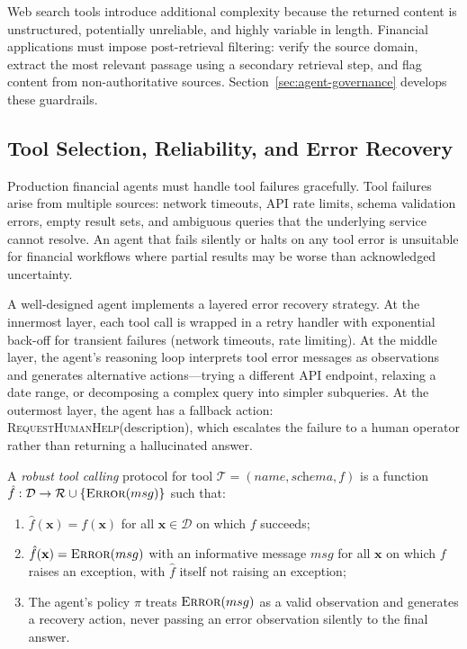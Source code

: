 \begin{deepdive}
Web search tools introduce additional complexity because the returned content is
unstructured, potentially unreliable, and highly variable in length. Financial
applications must impose post-retrieval filtering: verify the source domain, extract
the most relevant passage using a secondary retrieval step, and flag content from
non-authoritative sources. Section~\ref{sec:agent-governance} develops these guardrails.


\subsection{Tool Selection, Reliability, and Error Recovery}
\label{subsec:tool-reliability}

Production financial agents must handle tool failures gracefully. Tool failures arise
from multiple sources: network timeouts, API rate limits, schema validation errors,
empty result sets, and ambiguous queries that the underlying service cannot resolve.
An agent that fails silently or halts on any tool error is unsuitable for financial
workflows where partial results may be worse than acknowledged uncertainty.

A well-designed agent implements a layered error recovery strategy. At the innermost
layer, each tool call is wrapped in a retry handler with exponential back-off for
transient failures (network timeouts, rate limiting). At the middle layer, the agent's
reasoning loop interprets tool error messages as observations and generates alternative
actions---trying a different API endpoint, relaxing a date range, or decomposing a
complex query into simpler subqueries. At the outermost layer, the agent has a fallback
action: \textsc{RequestHumanHelp}(description), which escalates the failure to a human
operator rather than returning a hallucinated answer.

\begin{definition}
\label{def:robust-tool}
A \emph{robust tool calling} protocol for tool $\mathcal{T} = (\textit{name}, \textit{schema}, f)$
is a function $\hat{f}: \mathcal{D} \to \mathcal{R} \cup \{\textsc{Error}(msg)\}$ such that:
\begin{enumerate}
  \item $\hat{f}(\mathbf{x}) = f(\mathbf{x})$ for all $\mathbf{x} \in \mathcal{D}$
        on which $f$ succeeds;
  \item $\hat{f}(\mathbf{x}) = \textsc{Error}(msg)$ with an informative message $msg$
        for all $\mathbf{x}$ on which $f$ raises an exception, with $\hat{f}$ itself
        not raising an exception;
  \item The agent's policy $\pi$ treats $\textsc{Error}(msg)$ as a valid observation
        and generates a recovery action, never passing an error observation silently
        to the final answer.
\end{enumerate}
\end{definition}


\end{deepdive}
